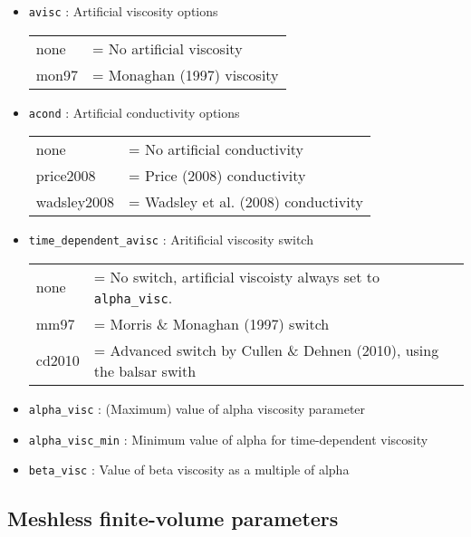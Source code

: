 \documentclass[a4paper]{article}
\newcommand{\var}[1]{\texttt{#1}}
\begin{document}
\begin{itemize}

\item \var{avisc} : Artificial viscosity options \\
\begin{tabular}{ll}
none  & = No artificial viscosity \\
mon97 & = Monaghan (1997) viscosity
\end{tabular}

\item \var{acond} : Artificial conductivity options \\
\begin{tabular}{ll}
none        & = No artificial conductivity \\
price2008   & = Price (2008) conductivity \\
wadsley2008 & = Wadsley et al. (2008) conductivity
\end{tabular}

\item \var{time\_dependent\_avisc} : Aritificial viscosity switch \\
\begin{tabular}{ll}
none     &= No switch, artificial viscoisty always set to \var{alpha\_visc}.\\
mm97     &= Morris \& Monaghan (1997) switch \\
cd2010   &= Advanced switch by Cullen \& Dehnen (2010), using the balsar swith
\end{tabular}

\item \var{alpha\_visc} : (Maximum) value of alpha viscosity parameter

\item \var{alpha\_visc\_min} : Minimum value of alpha for time-dependent viscosity

\item \var{beta\_visc} : Value of beta viscosity as a multiple of alpha


\end{itemize}



\subsection{Meshless finite-volume parameters}
\end{document}

